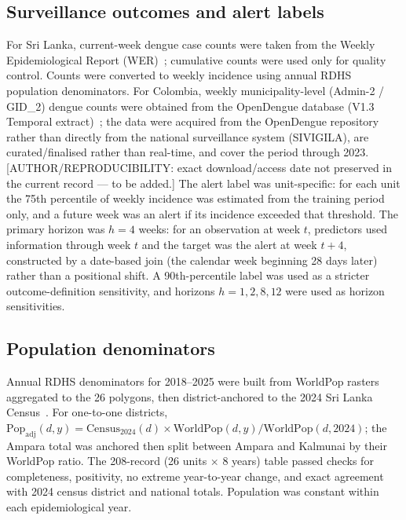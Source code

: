 \documentclass[11pt,a4paper]{article}
\begin{document}
\subsection{Surveillance outcomes and alert labels}
For Sri Lanka, current-week dengue case counts were taken from the Weekly Epidemiological Report (WER)~\cite{SriLankaWER}; cumulative counts were used only for quality control. Counts were converted to weekly incidence using annual RDHS population denominators. For Colombia, weekly municipality-level (Admin-2 / GID\_2) dengue counts were obtained from the OpenDengue database (V1.3 Temporal extract)~\cite{Clarke2024OpenDengue,OpenDengue2024}; the data were acquired from the OpenDengue repository rather than directly from the national surveillance system (SIVIGILA), are curated/finalised rather than real-time, and cover the period through 2023. [AUTHOR/REPRODUCIBILITY: exact download/access date not preserved in the current record --- to be added.] The alert label was unit-specific: for each unit the 75th percentile of weekly incidence was estimated from the training period only, and a future week was an alert if its incidence exceeded that threshold. The primary horizon was $h=4$ weeks: for an observation at week $t$, predictors used information through week $t$ and the target was the alert at week $t+4$, constructed by a date-based join (the calendar week beginning 28 days later) rather than a positional shift. A 90th-percentile label was used as a stricter outcome-definition sensitivity, and horizons $h=1,2,8,12$ were used as horizon sensitivities.

\subsection{Population denominators}
Annual RDHS denominators for 2018--2025 were built from WorldPop rasters~\cite{Tatem2017,WorldPop2025} aggregated to the 26 polygons, then district-anchored to the 2024 Sri Lanka Census~\cite{SriLankaCensus2025}. For one-to-one districts, $\mathrm{Pop}_{\mathrm{adj}}(d,y)=\mathrm{Census}_{2024}(d)\times \mathrm{WorldPop}(d,y)/\mathrm{WorldPop}(d,2024)$; the Ampara total was anchored then split between Ampara and Kalmunai by their WorldPop ratio. The 208-record (26 units $\times$ 8 years) table passed checks for completeness, positivity, no extreme year-to-year change, and exact agreement with 2024 census district and national totals. Population was constant within each epidemiological year.
\end{document}
